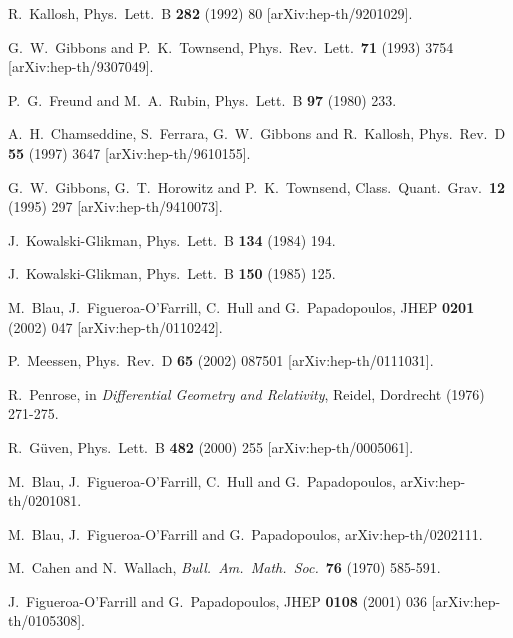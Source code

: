 \documentclass[12pt,a4paper]{article}
\begin{document}
\begin{thebibliography}{40}
R.~Kallosh,
Phys.\ Lett.\ B {\bf 282} (1992) 80
[arXiv:hep-th/9201029].

G.~W.~Gibbons and P.~K.~Townsend,
Phys.\ Rev.\ Lett.\  {\bf 71} (1993) 3754
[arXiv:hep-th/9307049].

P.~G.~Freund and M.~A.~Rubin,
Phys.\ Lett.\ B {\bf 97} (1980) 233.

A.~H.~Chamseddine, S.~Ferrara, G.~W.~Gibbons and R.~Kallosh,
Phys.\ Rev.\ D {\bf 55} (1997) 3647
[arXiv:hep-th/9610155].

G.~W.~Gibbons, G.~T.~Horowitz and P.~K.~Townsend,
Class.\ Quant.\ Grav.\  {\bf 12} (1995) 297
[arXiv:hep-th/9410073].

J.~Kowalski-Glikman,
Phys.\ Lett.\ B {\bf 134} (1984) 194.

J.~Kowalski-Glikman,
Phys.\ Lett.\ B {\bf 150} (1985) 125.

M.~Blau, J.~Figueroa-O'Farrill, C.~Hull and G.~Papadopoulos,
JHEP {\bf 0201} (2002) 047
[arXiv:hep-th/0110242].

P.~Meessen,
Phys.\ Rev.\ D {\bf 65} (2002) 087501
[arXiv:hep-th/0111031].

 R.~Penrose,
                  in
                  {\sl Differential Geometry and Relativity}, Reidel, 
                  Dordrecht (1976) 271-275.

R.~G\"uven,
Phys.\ Lett.\ B {\bf 482} (2000) 255
[arXiv:hep-th/0005061].

M.~Blau, J.~Figueroa-O'Farrill, C.~Hull and G.~Papadopoulos,
arXiv:hep-th/0201081.

M.~Blau, J.~Figueroa-O'Farrill and G.~Papadopoulos,
arXiv:hep-th/0202111.

 M.~Cahen and N.~Wallach,
                  {\it Bull.~Am.~Math.~Soc.}~\textbf{76} (1970) 585-591.

J.~Figueroa-O'Farrill and G.~Papadopoulos,
JHEP {\bf 0108} (2001) 036
[arXiv:hep-th/0105308].


\end{thebibliography}
\end{document}
